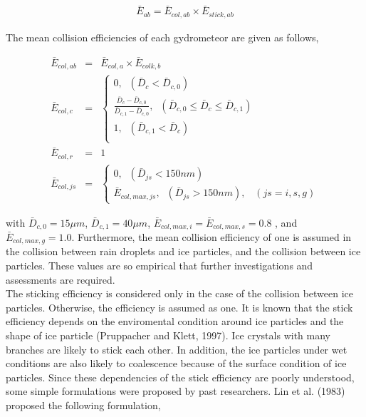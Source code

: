 \begin{eqnarray}
\bar{E}_{ab}=\bar{E}_{col,ab}\times\bar{E}_{stick,ab}\label{sn180}
\end{eqnarray}

The mean collision efficiencies of each gydrometeor are given as follows,

\begin{eqnarray}
\bar{E}_{col,ab}&=&\bar{E}_{col,a}\times\bar{E}_{colk,b}\label{sn181}\\
\bar{E}_{col,c}&=&
\left\{
\begin{array}{l}
0,\;\;(\bar{D}_{c}<\bar{D}_{c,0}) \\
\frac{\bar{D}_{c}-\bar{D}_{c,0}}{\bar{D}_{c,1}-\bar{D}_{c,0}},\;\;(\bar{D}_{c,0}\leq\bar{D}_{c}\leq\bar{D}_{c,1}) \\
1,\;\;(\bar{D}_{c,1}<\bar{D}_{c}) \\
\end{array}
\label{sn182}
\right.\\
\bar{E}_{col,r}&=&1\label{sn183}\\
\bar{E}_{col,js}&=&
\left\{
\begin{array}{l}
0,\;\;(\bar{D}_{js}<150nm) \\
\bar{E}_{col,max,js},\;\;(\bar{D}_{js}>150nm),\;\;\;(js=i,s,g)
\label{sn184}
\end{array}
\right.
\end{eqnarray}


with $\bar{D}_{c,0} = 15\mu m$, $\bar{D}_{c,1} = 40 \mu m$, $\bar{E}_{col,max,i}=\bar{E}_{col,max,s}=0.8$ , and $\bar{E}_{col,max,g}=1.0$. Furthermore, the mean collision efficiency of one is assumed in the collision between rain droplets and ice particles, and the collision between ice particles. These values are so empirical that further investigations and assessments are required.\\
The sticking efficiency is considered only in the case of the collision between ice particles. Otherwise, the efficiency is assumed as one. It is known that the stick efficiency depends on the enviromental condition around ice particles and the shape of ice particle (Pruppacher and Klett, 1997). Ice crystals with many branches are likely to stick each other. In addition, the ice particles under wet conditions are also likely to coalescence because of the surface condition of ice particles. Since these dependencies of the stick efficiency are poorly understood, some simple formulations were proposed by past researchers. Lin et al. (1983) proposed the following formulation,

